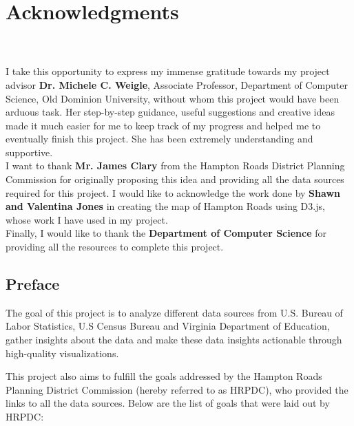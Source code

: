 \documentclass[12pt]{article}
\begin{document}
\chapter{\Large\selectfont\textbf{Acknowledgments}} \\\\

I take this opportunity to express my immense gratitude towards my project advisor \textbf{Dr. Michele C. Weigle}, Associate Professor, Department of Computer Science, Old Dominion University, without whom this project would have been arduous task. Her step-by-step guidance, useful suggestions and creative ideas made it much easier for me to keep track of my progress and helped me to eventually finish this project. She has been extremely understanding and supportive. \\

I want to thank \textbf{Mr. James Clary} from the Hampton Roads District Planning Commission for originally proposing this idea and providing all the data sources required for this project. I would like to acknowledge the work done by \textbf{Shawn and Valentina Jones} in creating the map of Hampton Roads using D3.js, whose work I have used in my project. \\

Finally, I would like to thank the \textbf{Department of Computer Science} for providing all the resources to complete this project.

\pagebreak


\tableofcontents
\pagebreak


\section{Preface}
The goal of this project is to analyze different data sources from U.S. Bureau of Labor Statistics, U.S Census Bureau and Virginia Department of Education, gather insights about the data and make these data insights actionable through high-quality visualizations. 

This project also aims to fulfill the goals addressed by the Hampton Roads Planning District Commission (hereby referred to as HRPDC), who provided the links to all the data sources.  Below are the list of goals that were laid out by HRPDC:
\end{document}
